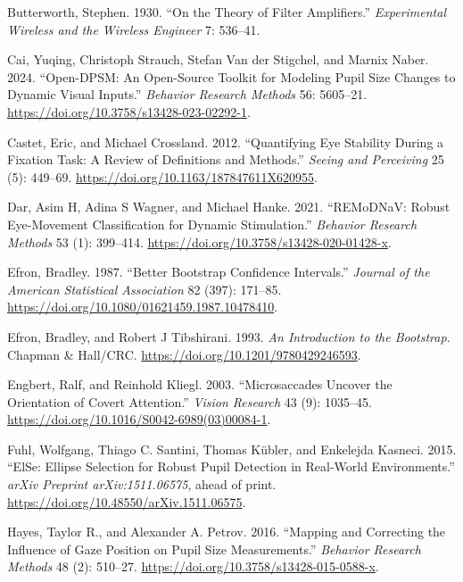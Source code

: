 \documentclass[
]{article}
\newlength{\cslhangindent}
\newenvironment{CSLReferences}[2] %
 {\begin{list}{}{%
  \setlength{\itemindent}{0pt}
  \setlength{\leftmargin}{0pt}
  \setlength{\parsep}{0pt}
  \ifodd #1
   \setlength{\leftmargin}{\cslhangindent}
   \setlength{\itemindent}{-1\cslhangindent}
  \fi
  \setlength{\itemsep}{#2\baselineskip}}}
 {\end{list}}
\begin{document}
\begin{CSLReferences}{1}{1}
Butterworth, Stephen. 1930. {``On the Theory of Filter Amplifiers.''}
\emph{Experimental Wireless and the Wireless Engineer} 7: 536--41.

Cai, Yuqing, Christoph Strauch, Stefan Van der Stigchel, and Marnix
Naber. 2024. {``Open-DPSM: An Open-Source Toolkit for Modeling Pupil
Size Changes to Dynamic Visual Inputs.''} \emph{Behavior Research
Methods} 56: 5605--21. \url{https://doi.org/10.3758/s13428-023-02292-1}.

Castet, Eric, and Michael Crossland. 2012. {``Quantifying Eye Stability
During a Fixation Task: A Review of Definitions and Methods.''}
\emph{Seeing and Perceiving} 25 (5): 449--69.
\url{https://doi.org/10.1163/187847611X620955}.

Dar, Asim H, Adina S Wagner, and Michael Hanke. 2021. {``REMoDNaV:
Robust Eye-Movement Classification for Dynamic Stimulation.''}
\emph{Behavior Research Methods} 53 (1): 399--414.
\url{https://doi.org/10.3758/s13428-020-01428-x}.

Efron, Bradley. 1987. {``Better Bootstrap Confidence Intervals.''}
\emph{Journal of the American Statistical Association} 82 (397):
171--85. \url{https://doi.org/10.1080/01621459.1987.10478410}.

Efron, Bradley, and Robert J Tibshirani. 1993. \emph{An Introduction to
the Bootstrap}. Chapman \& Hall/CRC.
\url{https://doi.org/10.1201/9780429246593}.

Engbert, Ralf, and Reinhold Kliegl. 2003. {``Microsaccades Uncover the
Orientation of Covert Attention.''} \emph{Vision Research} 43 (9):
1035--45. \url{https://doi.org/10.1016/S0042-6989(03)00084-1}.

Fuhl, Wolfgang, Thiago C. Santini, Thomas Kübler, and Enkelejda Kasneci.
2015. {``ElSe: Ellipse Selection for Robust Pupil Detection in
Real-World Environments.''} \emph{arXiv Preprint arXiv:1511.06575},
ahead of print. \url{https://doi.org/10.48550/arXiv.1511.06575}.

Hayes, Taylor R., and Alexander A. Petrov. 2016. {``Mapping and
Correcting the Influence of Gaze Position on Pupil Size Measurements.''}
\emph{Behavior Research Methods} 48 (2): 510--27.
\url{https://doi.org/10.3758/s13428-015-0588-x}.


\end{CSLReferences}
\end{document}
